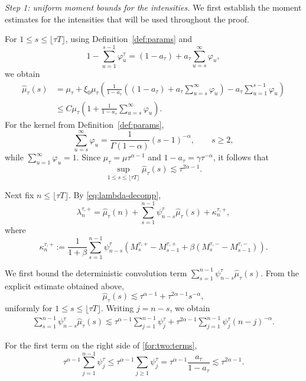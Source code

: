 \documentclass[letterpaper]{article}
\numberwithin{equation}{section}
\theoremstyle{definition}
\theoremstyle{remark}
\begin{document}
\medskip
\noindent
\textit{Step 1: uniform moment bounds for the intensities.}
We first establish the moment estimates for the intensities that will be used throughout the proof.

For $1\le s\le \lfloor \tau T\rfloor$, using Definition~\ref{def:params} and
\[
  1-\sum_{u=1}^{s-1}\varphi_u^\tau
  =(1-a_\tau)+a_\tau\sum_{u=s}^{\infty}\varphi_u,
\]
we obtain
\begin{align*}
  \hat\mu_\tau(s)
  &=\mu_\tau+\xi_0\mu_\tau\left(
      \frac{1}{1-a_\tau}\left((1-a_\tau)+a_\tau\sum_{u=s}^{\infty}\varphi_u\right)
      -a_\tau\sum_{u=1}^{s-1}\varphi_u
    \right) \\
  &\le C\mu_\tau\left(
      1+\frac{1}{1-a_\tau}\sum_{u=s}^{\infty}\varphi_u
    \right).
\end{align*}
For the kernel from Definition~\ref{def:params},
\[
  \sum_{u=s}^{\infty}\varphi_u
  =\frac{1}{\Gamma(1-\alpha)}(s-1)^{-\alpha},
  \qquad s\ge2,
\]
while $\sum_{u=1}^{\infty}\varphi_u=1$. Since
$\mu_\tau=\mu\tau^{\alpha-1}$ and $1-a_\tau=\gamma\tau^{-\alpha}$, it follows that
\begin{equation}\label{eq:muhat-uniform-bound-app-prop1}
  \sup_{1\le s\le \lfloor \tau T\rfloor}\hat\mu_\tau(s)
  \lesssim \tau^{2\alpha-1}.
\end{equation}

Next fix $n\le \lfloor \tau T\rfloor$. By \eqref{eq:lambda-decomp},
\[
  \lambda_n^{\tau,+}
  =
  \hat\mu_\tau(n)
  +
  \sum_{s=1}^{n-1}\psi_{n-s}^\tau \hat\mu_\tau(s)
  +
  \kappa_n^{\tau,+},
\]
where
\[
  \kappa_n^{\tau,+}
  :=
  \frac1{1+\beta}\sum_{s=1}^{n-1}\psi_{n-s}^{\tau}
  \left(
    M_s^{\tau,+}-M_{s-1}^{\tau,+}
    +\beta\left(M_s^{\tau,-}-M_{s-1}^{\tau,-}\right)
  \right).
\]

We first bound the deterministic convolution term $\sum_{s=1}^{n-1}\psi_{n-s}^\tau \hat\mu_\tau(s)$. From the explicit estimate obtained above,
\[
  \hat\mu_\tau(s)\lesssim \tau^{\alpha-1}+\tau^{2\alpha-1}s^{-\alpha},
\]
uniformly for $1\le s\le \lfloor \tau T\rfloor$. Writing $j=n-s$, we obtain
\begin{align}\label{for:two:terms}
  \sum_{s=1}^{n-1}\psi_{n-s}^\tau \hat\mu_\tau(s)
  \lesssim
  \tau^{\alpha-1}\sum_{j=1}^{n-1}\psi_j^\tau
  +\tau^{2\alpha-1}\sum_{j=1}^{n-1}\psi_j^\tau (n-j)^{-\alpha}.
\end{align}

For the first term on the right side of \eqref{for:two:terms},
\[
  \tau^{\alpha-1}\sum_{j=1}^{n-1}\psi_j^\tau
  \le
  \tau^{\alpha-1}\sum_{j\ge1}\psi_j^\tau
  =
  \tau^{\alpha-1}\frac{a_\tau}{1-a_\tau}
  \lesssim \tau^{2\alpha-1}.
\]
\end{document}

